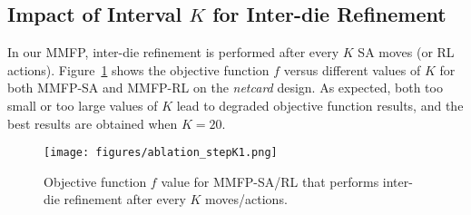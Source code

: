 \subsection{Impact of Interval $K$ for Inter-die Refinement}
In our MMFP, inter-die refinement is performed
after every $K$ SA moves (or RL actions).
Figure~\ref{fig:step_K} shows the objective function
$f$ versus different values of $K$ for both MMFP-SA and MMFP-RL on the \emph{netcard} design. As expected, both too small or too large values of $K$ lead to degraded objective function results, and the best results are obtained when 
$K=20.$


\begin{figure}[ht] 
\centering
\vspace{-2mm}
\texttt{[image: figures/ablation\_stepK1.png]}
\vspace{-2mm}
\caption{Objective function $f$ value for MMFP-SA/RL that performs inter-die refinement after every $K$ moves/actions.}
\label{fig:step_K}
\vspace{-2mm}
\end{figure}